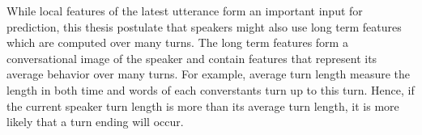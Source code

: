 While local features of the latest utterance form an important input for prediction, this thesis postulate that speakers might also use long term features which are computed over
many turns. The long term features form a conversational image of the speaker and contain features that represent its average behavior over many turns. For example, average turn length
measure the length in both time and words of each converstants turn up to this turn. Hence, if the current speaker turn length is more than its average turn length, it is more likely that a turn
ending will occur.







